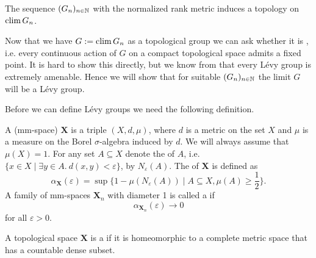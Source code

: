 \begin{lemma}\label{lem:GroupTopo}
The sequence $(G_n)_{n\in\mathbb{N}}$ with the normalized rank metric induces a topology on $\operatorname{clim} G_n$.
\end{lemma}

Now that we have $G:=\operatorname{clim} G_n$ as a topological group we can ask whether it is , i.e. every continuous action of $G$ on a compact topological space admits a fixed point. It is hard to show this directly, but we know from \cite{Levy} that every L\'evy group is extremely amenable. Hence we will show that for suitable $(G_n)_{n\in\mathbb{N}}$ the limit $G$ will be a L\'evy group.

Before we can define L\'evy groups we need the following definition.
\begin{definition}
A  (mm-space) $\boldsymbol{X}$ is a triple $(X,d,\mu)$, where $d$ is a metric on the set $X$ and $\mu$ is a measure on the Borel $\sigma$-algebra induced by $d$. We will always assume that $\mu(X)=1$. 
For any set $A\subseteq X$ denote the  of $A$, i.e. $\{x\in X\mid\exists y\in A.\  d(x,y)<\varepsilon\}$, by $N_\varepsilon(A)$.%
The  of $\boldsymbol{X}$ is defined as 
\[\alpha_{\boldsymbol{X}}(\varepsilon)=\sup\{1-\mu(N_\varepsilon(A))\mid A\subseteq X, \mu(A)\geq\frac{1}{2}\}.\]
A family of mm-spaces $\boldsymbol{X}_n$ with diameter 1 is called a  if 
\[\alpha_{\boldsymbol{X}_n}(\varepsilon)\to 0\]
for all $\varepsilon>0$.

A topological space $\boldsymbol{X}$ is a  if it is homeomorphic to a complete metric space that has a countable dense subset.
\end{definition}


